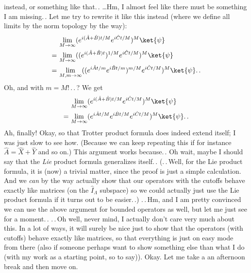 \documentclass{report}
\begin{document}
instead, or something like that.\,. \ldots Hm, I almost feel like there must be something I am missing.\,. Let me try to rewrite it like this instead (where we define all limits by the norm topology by the way):
\begin{align}
\begin{aligned}
	&\lim_{M \to \infty} (
		e^{i (\hat A + \hat B) t / M} e^{i \hat C t / M}
	)^M \ket{\psi} \\
	=\,
	&\lim_{M \to \infty} (
			(e^{i (\hat A + \hat B) t})^{1/M} e^{i \hat C t / M}
	)^M \ket{\psi} \\
		=\,
	&\lim_{M, m \to \infty} (
			(e^{i \hat A t / m} e^{i \hat B t / m})^{m/M} e^{i \hat C t / M}
		)^M \ket{\psi}.\,.
\end{aligned}
\end{align} 
Oh, and with $m=M$!\,.\,.\,? We get
\begin{align}
\begin{aligned}
	&\lim_{M \to \infty} (
		e^{i (\hat A + \hat B) t / M} e^{i \hat C t / M}
	)^M \ket{\psi} \\
	=\,
	&\lim_{M \to \infty} (
			e^{i \hat A t / M} e^{i \hat B t / M} e^{i \hat C t / M}
		)^M \ket{\psi}.\,.
\end{aligned}
\end{align} 
Ah, finally! Okay, so that Trotter product formula does indeed extend itself; I was just slow to see how. (Because we can keep repeating this if for instance $\hat A = \hat X + \hat Y$ and so on.) This argument works because.\,. Oh wait, maybe I should say that the \emph{Lie} product formula generalizes itself.\,. (.\,.\,Well, for the Lie product formula, it is (now) a trivial matter, since the proof is just a simple calculation. And we \emph{can} by the way actually show that our operators with the cutoffs behave exactly like matrices (on the $\hat I_\Lambda$ subspace) so we could actually just use the Lie product formula if it turns out to be easier.\,.) .\,.\,Hm, and I am pretty convinced we can use the above argument for bounded operators as well, but let me just see for a moment.\,. .\,.\,Oh well, never mind, I actually don't care very much about this. In a lot of ways, it will surely be nice just to show that the operators (with cutoffs) behave exactly like matrices, so that everything is just on easy mode from there (also if someone perhaps want to show something else than what I do (with my work as a starting point, so to say)). Okay. Let me take a an afternoon break and then move on.
\end{document}
